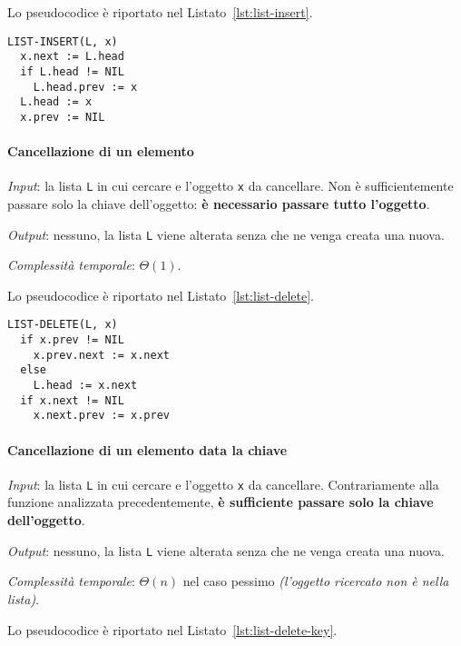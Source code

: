 \documentclass[italian, 10pt]{article}
\begin{document}
\bigskip
Lo pseudocodice è riportato nel Listato~\ref{lst:list-insert}.

\begin{lstlisting}[style=pseudocode, caption={Pseudocodice dell'algoritmo \texttt{LIST-INSERT}}, label={lst:list-insert}]
LIST-INSERT(L, x)
  x.next := L.head
  if L.head != NIL
    L.head.prev := x
  L.head := x
  x.prev := NIL
\end{lstlisting}

\paragraph{Cancellazione di un elemento}

\textit{Input}: la lista \texttt{L} in cui cercare e l'oggetto \texttt{x} da cancellare.
Non è sufficientemente passare solo la chiave dell'oggetto: \textbf{è necessario passare tutto l'oggetto}.

\textit{Output}: nessuno, la lista \texttt{L} viene alterata senza che ne venga creata una nuova.

\textit{Complessità temporale}: \(\Theta(1)\).

\bigskip
Lo pseudocodice è riportato nel Listato~\ref{lst:list-delete}.

\begin{lstlisting}[style=pseudocode, caption={Pseudocodice dell'algoritmo \texttt{LIST-DELETE}}, label={lst:list-delete}]
LIST-DELETE(L, x)
  if x.prev != NIL
    x.prev.next := x.next
  else
    L.head := x.next
  if x.next != NIL
    x.next.prev := x.prev
\end{lstlisting}

\paragraph{Cancellazione di un elemento data la chiave}

\textit{Input}: la lista \texttt{L} in cui cercare e l'oggetto \texttt{x} da cancellare.
Contrariamente alla funzione analizzata precedentemente, \textbf{è sufficiente passare solo la chiave dell'oggetto}.

\textit{Output}: nessuno, la lista \texttt{L} viene alterata senza che ne venga creata una nuova.

\textit{Complessità temporale}: \(\Theta(n)\) nel caso pessimo \textit{(l'oggetto ricercato non è nella lista)}.

\bigskip
Lo pseudocodice è riportato nel Listato~\ref{lst:list-delete-key}.
\end{document}
